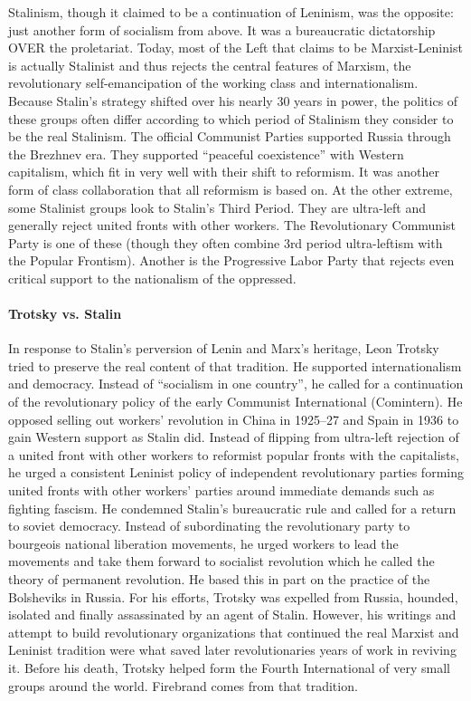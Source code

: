 Stalinism, though it claimed to be a continuation of Leninism, was the opposite: just another form of socialism from above. It was a bureaucratic dictatorship OVER the proletariat. Today, most of the Left that claims to be Marxist-Leninist is actually Stalinist and thus rejects the central features of Marxism, the revolutionary self-emancipation of the working class and internationalism. Because Stalin's strategy shifted over his nearly 30 years in power, the politics of these groups often differ according to which period of Stalinism they consider to be the real Stalinism. The official Communist Parties supported Russia through the Brezhnev era. They supported ``peaceful coexistence'' with Western capitalism, which fit in very well with their shift to reformism. It was another form of class collaboration that all reformism is based on. At the other extreme, some Stalinist groups look to Stalin's Third Period. They are ultra-left and generally reject united fronts with other workers. The Revolutionary Communist Party is one of these (though they often combine 3rd period ultra-leftism with the Popular Frontism). Another is the Progressive Labor Party that rejects even critical support to the nationalism of the oppressed.

\paragraph{Trotsky vs. Stalin}

In response to Stalin's perversion of Lenin and Marx's heritage, Leon Trotsky tried to preserve the real content of that tradition. He supported internationalism and democracy. Instead of ``socialism in one country'', he called for a continuation of the revolutionary policy of the early Communist International (Comintern). He opposed selling out workers' revolution in China in 1925--27 and Spain in 1936 to gain Western support as Stalin did. Instead of flipping from ultra-left rejection of a united front with other workers to reformist popular fronts with the capitalists, he urged a consistent Leninist policy of independent revolutionary parties forming united fronts with other workers' parties around immediate demands such as fighting fascism. He condemned Stalin's bureaucratic rule and called for a return to soviet democracy. Instead of subordinating the revolutionary party to bourgeois national liberation movements, he urged workers to lead the movements and take them forward to socialist revolution which he called the theory of permanent revolution. He based this in part on the practice of the Bolsheviks in Russia. For his efforts, Trotsky was expelled from Russia, hounded, isolated and finally assassinated by an agent of Stalin. However, his writings and attempt to build revolutionary organizations that continued the real Marxist and Leninist tradition were what saved later revolutionaries years of work in reviving it. Before his death, Trotsky helped form the Fourth International of very small groups around the world. Firebrand comes from that tradition.

